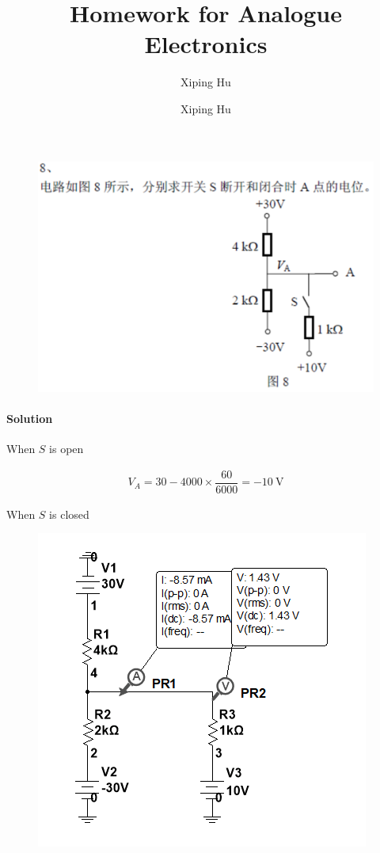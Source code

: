 \documentclass{article}
\author{Xiping Hu}
\author{Xiping Hu}
\affil{http://thehxp.tech/}
\title{Homework for Analogue Electronics}
\begin{document}
\maketitle

\begin{figure}[H]
  \centering
  \includegraphics[width=\linewidth]{figures/8}
  \label{fig:}
\end{figure}

\paragraph{Solution}

When $S$ is open

\begin{equation*}
  \begin{aligned}
    V_A = 30 - 4000 \times \dfrac{60}{6000} = - 10 \  \mathrm{V}
  \end{aligned}
\end{equation*}

When $S$ is closed

\begin{figure}[H]
  \centering
  \includegraphics[width=0.5\linewidth]{figures/11}
  \label{fig:}
\end{figure}
\end{document}
